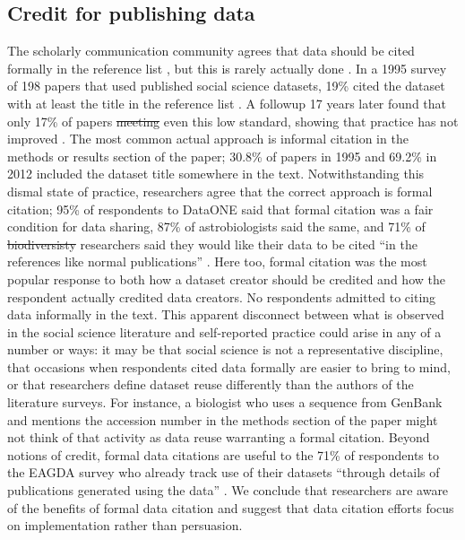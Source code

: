 \documentclass[10pt]{article}
\providecommand{\DIFaddtex}[1]{{\protect\color{blue}\uwave{#1}}} %
\providecommand{\DIFdeltex}[1]{{\protect\color{red}\sout{#1}}}                      %
\providecommand{\DIFaddbegin}{} %
\providecommand{\DIFaddend}{} %
\providecommand{\DIFdelbegin}{} %
\providecommand{\DIFdelend}{} %
\providecommand{\DIFadd}[1]{\texorpdfstring{\DIFaddtex{#1}}{#1}} %
\providecommand{\DIFdel}[1]{\texorpdfstring{\DIFdeltex{#1}}{}} %
\begin{document}
\subsection*{Credit for publishing data}

The scholarly communication community agrees that data should be cited formally in the reference list \cite{force11_data_citation_synthesis_group_joint_2014}, but this is rarely actually done \cite{sieber_not_1995, mooney_citing_2011, mooney_anatomy_2012}.
In a 1995 survey of 198 papers that used published social science datasets, 19\% cited the dataset with at least the title in the reference list \cite{sieber_not_1995}.
A followup 17 years later found that only 17\% of papers \DIFdelbegin \DIFdel{meeting }\DIFdelend \DIFaddbegin \DIFadd{met }\DIFaddend even this low standard, showing that practice has not improved \cite{mooney_anatomy_2012}.
The most common actual approach is informal citation in the methods or results section of the paper; 30.8\% of papers in 1995 and 69.2\% in 2012 included the dataset title somewhere in the text.
Notwithstanding this dismal state of practice, researchers agree that the correct approach is formal citation; 95\% of respondents to DataONE said that formal citation was a fair condition for data sharing, 87\% of astrobiologists said the same, and 71\% of \DIFdelbegin \DIFdel{biodiversisty }\DIFdelend \DIFaddbegin \DIFadd{biodiversity }\DIFaddend researchers said they would like their data to be cited ``in the references like normal publications'' \cite{tenopir_data_2011, aydinoglu_data_2014, enke_users_2012}.
Here too, formal citation was the most popular response to both how a dataset creator should be credited and how the respondent actually credited data creators.
No respondents admitted to citing data informally in the text.
This apparent disconnect between what is observed in the social science literature and self-reported practice could arise in any of a number or ways: it may be that social science is not a representative discipline, that occasions when respondents cited data formally are easier to bring to mind, or that researchers define dataset reuse differently than the authors of the literature surveys.
For instance, a biologist who uses a sequence from GenBank and mentions the accession number in the methods section of the paper might not think of that activity as data reuse warranting a formal citation.
Beyond notions of credit, formal data citations are useful to the 71\% of respondents to the EAGDA survey who already track use of their datasets ``through details of publications generated using the data'' \cite{bobrow_establishing_2014}. 
We conclude that researchers are aware of the benefits of formal data citation and suggest that data citation efforts focus on implementation rather than persuasion. 
\end{document}
